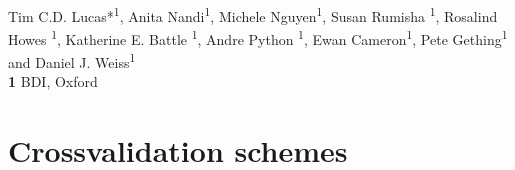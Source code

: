 \documentclass[10pt,a4]{article}
\begin{document}
\vspace*{0.2in}

\begin{flushleft}
{\Large
\textbf{} %
}
\newline
\\
Tim C.D. Lucas*\textsuperscript{1}, Anita Nandi\textsuperscript{1}, Michele Nguyen\textsuperscript{1}, Susan Rumisha \textsuperscript{1}, Rosalind Howes \textsuperscript{1}, Katherine E. Battle \textsuperscript{1}, Andre Python \textsuperscript{1}, Ewan Cameron\textsuperscript{1}, Pete Gething\textsuperscript{1} and Daniel J. Weiss\textsuperscript{1}
\\
\bigskip
\textbf{1} BDI, Oxford
\\
\bigskip

\end{flushleft}



% 
%


\section{Crossvalidation schemes}
\end{document}
